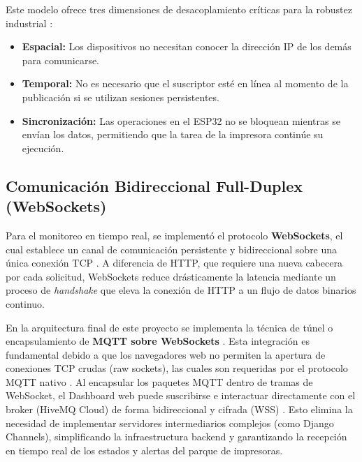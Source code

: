\par Este modelo ofrece tres dimensiones de desacoplamiento críticas para la robustez industrial \cite{OASIS_MQTT_v5}:

\begin{itemize} 
    \item \textbf{Espacial:} Los dispositivos no necesitan conocer la dirección IP de los demás para comunicarse. 
    \item \textbf{Temporal:} No es necesario que el suscriptor esté en línea al momento de la publicación si se utilizan sesiones persistentes. 
    \item \textbf{Sincronización:} Las operaciones en el ESP32 no se bloquean mientras se envían los datos, permitiendo que la tarea de la impresora continúe su ejecución. 
\end{itemize}

\subsection{Comunicación Bidireccional Full-Duplex (WebSockets)}

\par Para el monitoreo en tiempo real, se implementó el protocolo \textbf{WebSockets}, el cual establece un canal de comunicación persistente y bidireccional sobre una única conexión TCP \cite{RFC6455_WebSockets, Fierro_WebSockets_2017}. A diferencia de HTTP, que requiere una nueva cabecera por cada solicitud, WebSockets reduce drásticamente la latencia mediante un proceso de \textit{handshake} que eleva la conexión de HTTP a un flujo de datos binarios continuo.\\

\par En la arquitectura final de este proyecto se implementa la técnica de túnel o encapsulamiento de \textbf{MQTT sobre WebSockets} \cite{OASIS_MQTT_v5, Fierro_WebSockets_2017}. Esta integración es fundamental debido a que los navegadores web no permiten la apertura de conexiones TCP crudas (raw sockets), las cuales son requeridas por el protocolo MQTT nativo \cite{RFC6455_WebSockets}. Al encapsular los paquetes MQTT dentro de tramas de WebSocket, el Dashboard web puede suscribirse e interactuar directamente con el broker (HiveMQ Cloud) de forma bidireccional y cifrada (WSS) \cite{OASIS_MQTT_v5}. Esto elimina la necesidad de implementar servidores intermediarios complejos (como Django Channels), simplificando la infraestructura backend y garantizando la recepción en tiempo real de los estados y alertas del parque de impresoras.

